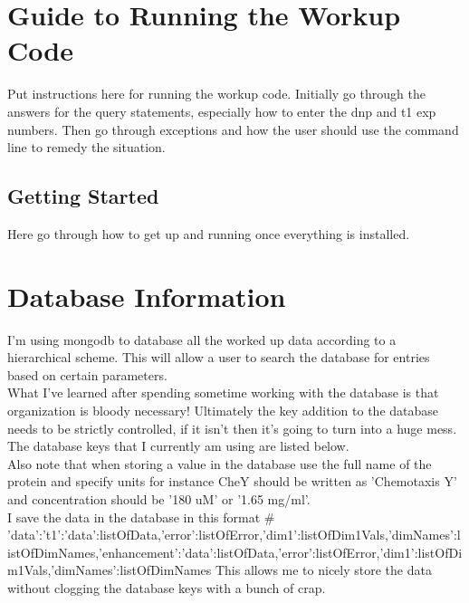 \documentclass[10pt]{book}
\begin{document}
\chapter{Guide to Running the Workup Code}
Put instructions here for running the workup code. Initially go through the answers for the query statements, especially how to enter the dnp and t1 exp numbers. Then go through exceptions and how the user should use the command line to remedy the situation.

\section{Getting Started}
Here go through how to get up and running once everything is installed.

\chapter{Database Information}
I'm using mongodb to database all the worked up data according to a hierarchical scheme. This will allow a user to search the database for entries based on certain parameters. \\

What I've learned after spending sometime working with the database is that organization is bloody necessary! Ultimately the key addition to the database needs to be strictly controlled, if it isn't then it's going to turn into a huge mess. The database keys that I currently am using are listed below.\\

Also note that when storing a value in the database use the full name of the protein and specify units for instance CheY should be written as 'Chemotaxis Y' and concentration should be '180 uM' or '1.65 mg/ml'. \\

I save the data in the database in this format 
# {'data':{'t1':{'data':listOfData,'error':listOfError,'dim1':listOfDim1Vals,'dimNames':listOfDimNames},'enhancement':{'data':listOfData,'error':listOfError,'dim1':listOfDim1Vals,'dimNames':listOfDimNames}}}
This allows me to nicely store the data without clogging the database keys with a bunch of crap.
\end{document}
